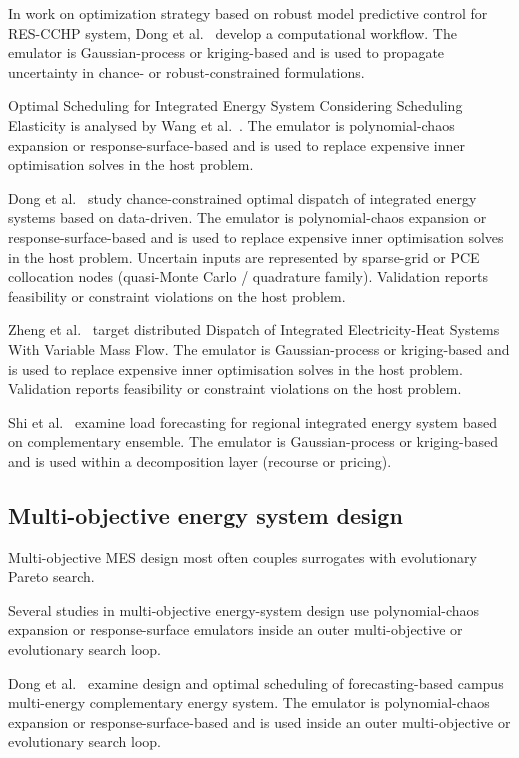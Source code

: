 In work on optimization strategy based on robust model predictive control for RES-CCHP system, Dong et al.~\cite{Dong2022} develop a computational workflow. The emulator is Gaussian-process or kriging-based and is used to propagate uncertainty in chance- or robust-constrained formulations.

Optimal Scheduling for Integrated Energy System Considering Scheduling Elasticity is analysed by Wang et al.~\cite{Wang2020202933}. The emulator is polynomial-chaos expansion or response-surface-based and is used to replace expensive inner optimisation solves in the host problem.

Dong et al.~\cite{Dong2023} study chance-constrained optimal dispatch of integrated energy systems based on data-driven. The emulator is polynomial-chaos expansion or response-surface-based and is used to replace expensive inner optimisation solves in the host problem. Uncertain inputs are represented by sparse-grid or PCE collocation nodes (quasi-Monte Carlo / quadrature family). Validation reports feasibility or constraint violations on the host problem.

Zheng et al.~\cite{Zheng20231907} target distributed Dispatch of Integrated Electricity-Heat Systems With Variable Mass Flow. The emulator is Gaussian-process or kriging-based and is used to replace expensive inner optimisation solves in the host problem. Validation reports feasibility or constraint violations on the host problem.

Shi et al.~\cite{Shi2024__2} examine load forecasting for regional integrated energy system based on complementary ensemble. The emulator is Gaussian-process or kriging-based and is used within a decomposition layer (recourse or pricing).

\subsection{Multi-objective energy system design}
\label{sec:apps:moo}

Multi-objective MES design most often couples surrogates with evolutionary Pareto search.

Several studies in multi-objective energy-system design use polynomial-chaos expansion or response-surface emulators inside an outer multi-objective or evolutionary search loop.

Dong et al.~\cite{Dong2024} examine design and optimal scheduling of forecasting-based campus multi-energy complementary energy system. The emulator is polynomial-chaos expansion or response-surface-based and is used inside an outer multi-objective or evolutionary search loop.

